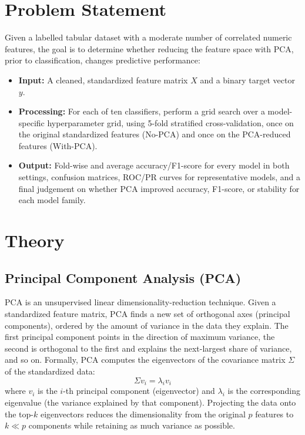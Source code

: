 \documentclass[12pt,a4paper]{article}
\begin{document}
\section{Problem Statement}
\label{sec:problem-statement-note}
Given a labelled tabular dataset with a moderate number of correlated numeric features, the goal is to determine whether reducing the feature space with PCA, prior to classification, changes predictive performance:
\begin{itemize}[leftmargin=*]
    \item \textbf{Input:} A cleaned, standardized feature matrix $X$ and a binary target vector $y$.
    \item \textbf{Processing:} For each of ten classifiers, perform a grid search over a model-specific hyperparameter grid, using 5-fold stratified cross-validation, once on the original standardized features (No-PCA) and once on the PCA-reduced features (With-PCA).
    \item \textbf{Output:} Fold-wise and average accuracy/F1-score for every model in both settings, confusion matrices, ROC/PR curves for representative models, and a final judgement on whether PCA improved accuracy, F1-score, or stability for each model family.
\end{itemize}

\section{Theory}

\subsection{Principal Component Analysis (PCA)}
PCA is an unsupervised linear dimensionality-reduction technique. Given a standardized feature matrix, PCA finds a new set of orthogonal axes (principal components), ordered by the amount of variance in the data they explain. The first principal component points in the direction of maximum variance, the second is orthogonal to the first and explains the next-largest share of variance, and so on. Formally, PCA computes the eigenvectors of the covariance matrix $\Sigma$ of the standardized data:
\begin{equation}
\Sigma v_i = \lambda_i v_i
\end{equation}
where $v_i$ is the $i$-th principal component (eigenvector) and $\lambda_i$ is the corresponding eigenvalue (the variance explained by that component). Projecting the data onto the top-$k$ eigenvectors reduces the dimensionality from the original $p$ features to $k \ll p$ components while retaining as much variance as possible.
\end{document}
